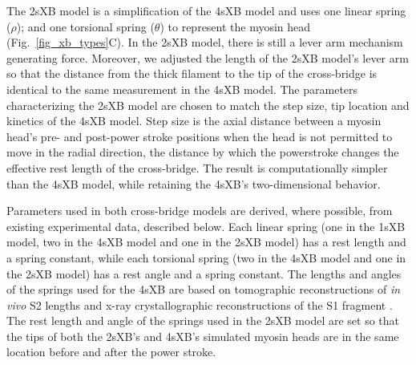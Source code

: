 \documentclass[11pt,titlepage]{article}
\begin{document}
The 2sXB model is a simplification of the 4sXB model and uses one linear spring ($\rho$); and one torsional spring ($\theta$) to represent the myosin head (Fig.~\ref{fig_xb_types}C). 
In the 2sXB model, there is still a lever arm mechanism generating force.  
Moreover, we adjusted the length of the 2sXB model's lever arm so that the distance from the thick filament to the tip of the cross-bridge is identical to the same measurement in the 4sXB model.
The parameters characterizing the 2sXB model are chosen to match the step size, tip location and kinetics of the 4sXB model. 
Step size is the axial distance between a myosin head's pre- and post-power stroke positions when the head is not permitted to move in the radial direction, the distance by which the powerstroke changes the effective rest length of the cross-bridge. 
The result is computationally simpler than the 4sXB model, while retaining the 4sXB's two-dimensional behavior.

Parameters used in both cross-bridge models are derived, where possible, from existing experimental data, described below.  
Each linear spring (one in the 1sXB model, two in the 4sXB model and one in the 2sXB model) has a rest length and a spring constant, while each torsional spring (two in the 4sXB model and one in the 2sXB model) has a rest angle and a spring constant. 
The lengths and angles of the springs used for the 4sXB are based on tomographic reconstructions of \emph{in vivo} S2 lengths and x-ray crystallographic reconstructions of the S1 fragment \citep{Taylor1999, Rayment1993}.
The rest length and angle of the springs used in the 2sXB model are set so that the tips of both the 2sXB's and 4sXB's simulated myosin heads are in the same location before and after the power stroke.
\end{document}

